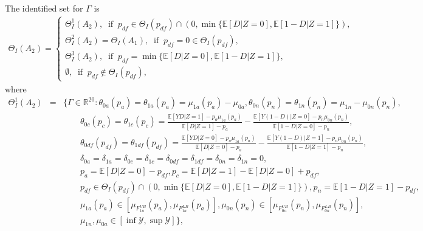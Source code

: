 \documentclass[12pt]{article}
\theoremstyle{plain}
\theoremstyle{definition}
\theoremstyle{remark}
\begin{document}
The identified set for $\Gamma$ is 
\begin{eqnarray*}
\Theta_I(A_2)=\left\{\begin{array}{l}
        \Theta_I^1(A_2),\ \text{ if }\ p_{df} \in \Theta_I(p_{df}) \cap (0,\min\{\mathbb{E}[D  \vert  Z=0], \mathbb{E}[1-D  \vert  Z=1]\}),\\
       \Theta_I^2(A_2)=\Theta_I(A_1),\ \text{ if }\ p_{df}=0\in \Theta_I(p_{df}),\\
       \Theta_I^3(A_2),\ \text{ if }\ p_{df}=\min\{\mathbb{E}[D  \vert  Z=0], \mathbb{E}[1-D  \vert  Z=1]\},\\
       \emptyset,\ \text{ if }\ p_{df} \not\in \Theta_I(p_{df}),        \end{array}\right.
\end{eqnarray*}
where
\begin{eqnarray*}
    \Theta_I^1(A_2) &=& \Bigg \{\Gamma \in \mathbb R^{20}: \theta_{0a}(p_a)=\theta_{1a}(p_a) = \mu_{1a}(p_a) - \mu_{0a}, \theta_{0n}(p_n) = \theta_{1n}(p_n) = \mu_{1n} - \mu_{0n}(p_n),\\
   && \qquad \theta_{0c}(p_{c})=\theta_{1c}(p_{c})=\frac{\mathbb{E}[Y D  \vert  Z=1]-p_a \mu_{1 a}(p_a)}{\mathbb{E}[D  \vert  Z=1]-p_a}-\frac{\mathbb{E}[Y(1-D)  \vert  Z=0]-p_n \mu_{0 n}(p_n)}{\mathbb{E}[1-D  \vert  Z=0]-p_n},\\   
   &&\qquad \theta_{0df}(p_{df})=\theta_{1df}(p_{df}) = \frac{\mathbb{E}[Y D  \vert  Z=0]-p_a \mu_{1 a}(p_a)}{\mathbb{E}[D  \vert  Z=0]-p_a}- \frac{\mathbb{E}[Y(1-D)  \vert  Z=1]-p_n \mu_{0 n}(p_n)}{\mathbb{E}[1-D  \vert  Z=1]-p_n},\\   
   && \qquad \delta_{0a}=\delta_{1a}=\delta_{0c}=\delta_{1c}=\delta_{0df}=\delta_{1df}=\delta_{0n}=\delta_{1n}=0,\\
   && \qquad p_a=\mathbb{E}[D  \vert  Z=0]-p_{d f}, p_c=\mathbb{E}[D  \vert  Z=1] - \mathbb{E}[D  \vert  Z=0] +p_{df},\\
   && \qquad p_{df}\in \Theta_I(p_{df}) \cap (0,\min\{\mathbb{E}[D  \vert  Z=0], \mathbb{E}[1-D  \vert  Z=1]\}), p_n=\mathbb{E}[1-D  \vert  Z=1]-p_{d f},\\
    && \qquad \mu_{1a}(p_a) \in \left[\mu_{F_{1a}^{UB}}(p_a),\mu_{F_{1a}^{LB}}(p_a)\right], 
    \mu_{0n}(p_n)\in \left[\mu_{F_{0n}^{UB}}(p_{n}),\mu_{F_{0n}^{LB}}(p_{n})\right],  \\
    && \qquad \mu_{1n}, \mu_{0a} \in \left[\inf \mathcal{Y}, \sup \mathcal{Y}\right]
   \Bigg \}, 
\end{eqnarray*}
\end{document}
